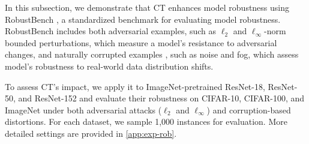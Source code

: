 \begin{table*}[t]
    \begin{subtable}[]{0.65\linewidth}
        \centering
        \caption{\small \textbf{ResNet-152.} Avg rel improve: 498.41\%. Avg $\beta$: 0.98.}
        \label{tab:rob-ResNet-152-full}
    \end{subtable}
    \vskip -0.1in
\end{table*}
In this subsection, we demonstrate that CT enhances model robustness using RobustBench \cite{croce2020robustbench}, a standardized benchmark for evaluating model robustness. RobustBench includes both adversarial examples, such as $\ell_2$ and $\ell_\infty$-norm bounded perturbations, which measure a model’s resistance to adversarial changes, and naturally corrupted examples \cite{hendrycks2019corruption}, such as noise and fog, which assess model's robustness to real-world data distribution shifts.

To assess CT’s impact, we apply it to ImageNet-pretrained ResNet-18, ResNet-50, and ResNet-152 and evaluate their robustness on CIFAR-10, CIFAR-100, and ImageNet under both adversarial attacks ($\ell_2$ and $\ell_\infty$) and corruption-based distortions. For each dataset, we sample 1,000 instances for evaluation. More detailed settings are provided in \cref{app:exp-rob}.

